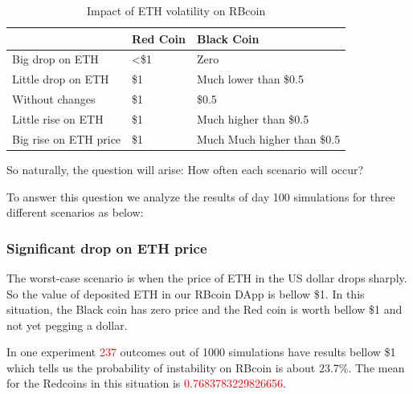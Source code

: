 \begin{table}[H]
\begin{tabular}{l|l|l|}
\cline{2-3}
                                                                & {\color[HTML]{000000} Red Coin} & Black Coin                  \\ \hline
\multicolumn{1}{|l|}{{\color[HTML]{000000} Big drop on ETH}}    & \textless{}\$1                  & Zero                        \\ \hline
\multicolumn{1}{|l|}{{\color[HTML]{000000} Little drop on ETH}} & \$1                             & Much lower than \$0.5       \\ \hline
\multicolumn{1}{|l|}{Without changes}                           & \$1                             & \$0.5                       \\ \hline
\multicolumn{1}{|l|}{Little rise on ETH}                        & \$1                             & Much higher than \$0.5      \\ \hline
\multicolumn{1}{|l|}{Big rise on ETH price}                     & \$1                             & Much Much higher than \$0.5 \\ \hline
\end{tabular}
\caption{Impact of ETH volatility on RBcoin}
\label{tbl1}
\end{table}

So naturally, the question will arise: How often each scenario will occur? 

To answer this question we analyze the results of day 100 simulations for three different scenarios as below:


\subsubsection{Significant drop on ETH price}
The worst-case scenario is when the price of ETH in the US dollar drops sharply. So the value of deposited ETH in our RBcoin DApp is bellow \$1. In this situation, the Black coin has zero price and the Red coin is worth bellow \$1 and not yet pegging a dollar. 

In one experiment \textcolor{red}{237} outcomes out of 1000 simulations have results bellow \$1 which tells us the probability of instability on RBcoin is about 23.7\%. The mean for the Redcoins in this situation is \textcolor{red}{0.7683783229826656}. 

